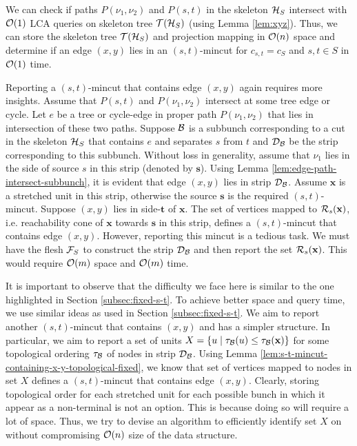 We can check if paths $P(\nu_1,\nu_2)$ and $P(s,t)$ in the skeleton ${\cal H}_S$ intersect with ${\cal O}(1)$ LCA queries on skeleton tree ${\cal T}({\cal H}_S)$ (using Lemma \ref{lem:xyz}). Thus, we can store the skeleton tree ${\cal T}({\cal H}_S)$ and projection mapping in ${\cal O}(n)$ space and determine if an edge $(x,y)$ lies in an $(s,t)$-mincut for $c_{s,t}=c_S$ and $s,t \in S$ in ${\cal O}(1)$ time.


Reporting a $(s,t)$-mincut that contains edge $(x,y)$ again requires more insights. Assume that $P(s,t)$ and $P(\nu_1,\nu_2)$ intersect at some tree edge or cycle. Let $e$ be a tree or cycle-edge in proper path $P(\nu_1,\nu_2)$ that lies in intersection of these two paths. Suppose ${\cal B}$ is a subbunch corresponding to a cut in the skeleton ${\cal H}_S$ that contains $e$ and separates $s$ from $t$ and ${\cal D}_{\cal B}$ be the strip corresponding to this subbunch. Without loss in generality, assume that $\nu_1$ lies in the side of source $s$ in this strip (denoted by ${\mathbf s}$). Using Lemma \ref{lem:edge-path-intersect-subbunch}, it is evident that edge $(x,y)$ lies in strip ${\cal D}_{\cal B}$. Assume $\mathbf x$ is a stretched unit in this strip, otherwise the source $\mathbf s$ is the required $(s,t)$-mincut. Suppose $(x,y)$ lies in side-$\mathbf t$ of $\mathbf x$. The set of vertices mapped to ${\cal R}_s(\mathbf{x})$, i.e. reachability cone of $\mathbf x$ towards $\mathbf s$ in this strip, defines a $(s,t)$-mincut that contains edge $(x,y)$. However, reporting this mincut is a tedious task. We must have the flesh ${\cal F}_S$ to construct the strip ${\cal D}_{\cal B}$ and then report the set ${\cal R}_s(\mathbf{x})$. This would require ${\cal O}(m)$ space and ${\cal O}(m)$ time.

It is important to observe that the difficulty we face here is similar to the one highlighted in Section \ref{subsec:fixed-s-t}. To achieve better space and query time, we use similar ideas as used in Section \ref{subsec:fixed-s-t}. We aim to report another $(s,t)$-mincut that contains $(x,y)$ and has a simpler structure. In particular, we aim to report a set of units $X = \{ u \;|\; \tau_{\cal B}(u)\leq \tau_{\cal B}(\mathbf{x})\}$ for some topological ordering $\tau_{\cal B}$ of nodes in strip ${\cal D}_{\cal B}$. Using Lemma \ref{lem:s-t-mincut-containing-x-y-topological-fixed}, we know that set of vertices mapped to nodes in set $X$ defines a $(s,t)$-mincut that contains edge $(x,y)$. Clearly, storing topological order for each stretched unit for each possible bunch in which it appear as a non-terminal is not an option. This is because doing so will require a lot of space. Thus, we try to devise an algorithm to efficiently identify set $X$ on without compromising ${\cal O}(n)$ size of the data structure.

